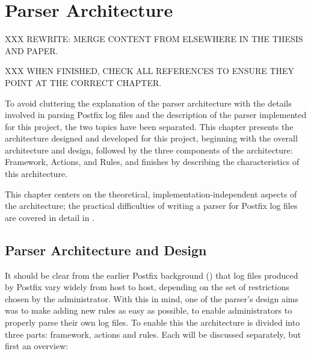\chapter{Parser Architecture}

\label{parser architecture}

XXX REWRITE\@: MERGE CONTENT FROM ELSEWHERE IN THE THESIS AND PAPER\@.

XXX WHEN FINISHED, CHECK ALL REFERENCES TO ENSURE THEY POINT AT THE CORRECT
CHAPTER\@.

To avoid cluttering the explanation of the parser architecture with the
details involved in parsing Postfix log files and the description of the
parser implemented for this project, the two topics have been separated.
This chapter presents the architecture designed and developed for this
project, beginning with the overall architecture and design, followed by
the three components of the architecture: Framework, Actions, and Rules,
and finishes by describing the characteristics of this architecture.

This chapter centers on the theoretical, implementation-independent aspects
of the architecture; the practical difficulties of writing a parser for
Postfix log files are covered in detail in .

\section{Parser Architecture and Design}

\label{parser design}

It should be clear from the earlier Postfix background () that log files produced by Postfix vary widely from host to
host, depending on the set of restrictions chosen by the administrator.
With this in mind, one of the parser's design aims was to make adding new
rules as easy as possible, to enable administrators to properly parse their
own log files.  To enable this the architecture is divided into three
parts: framework, actions and rules.  Each will be discussed separately,
but first an overview:

